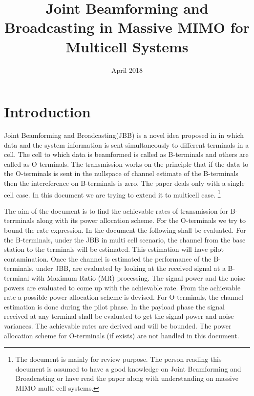 \documentclass[10pt, a4paper, twoside,fleqn]{article}
\title{Joint Beamforming and Broadcasting in Massive MIMO for Multicell Systems}
\author{}
\date{April 2018}
\begin{document}
\maketitle
 
\section{Introduction}
	Joint Beamforming and Broadcasting(JBB) is a novel idea proposed in \cite{bib:jbb} in which data and the system information is sent simultaneously to different terminals in a cell. The cell to which data is beamformed is called as B-terminals and others are called as O-terminals. The transmission works on the principle that if the data to the O-terminals is sent in the nullspace of channel estimate of the B-terminals then the intereference on B-terminals is zero. The paper \cite{bib:jbb} deals only with a single cell case. In this document we are trying to extend it to multicell case.
\footnote{The document is mainly for review purpose. The person reading this document is assumed to have a good knowledge on Joint Beamforming and Broadcasting or have read the paper \cite{bib:jbb} along with understanding on massive MIMO multi cell systems.}
	
	The aim of the document is to find the achievable rates of transmission for B-terrminals along with its power allocation scheme. For the O-terminals we try to bound the rate expression. In the document the following shall be evaluated. For the B-terminals, under the JBB in multi cell scenario, the channel from the base station to the terminals will be estimated. This estimation will have pilot contamination. Once the channel is estimated the performance of the B-terminals, under JBB, are evaluated by looking at the received signal at a B-terminal with Maximum Ratio (MR) processing. The signal power and the noise powers are evaluated to come up with the achievable rate. From the achievable rate a possible power allocation scheme is devised. For O-terminals, the channel estimation is done during the pilot phase. In the payload phase the signal received at any terminal shall be evaluated to get the signal power and noise variances. The achievable rates are derived and will be bounded. The power allocation scheme for O-terminals (if exists) are not handled in this document.
\end{document}
